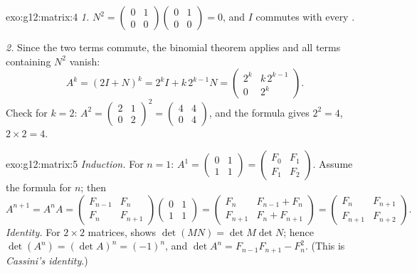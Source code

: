 \begin{solution}{exo:g12:matrix:4}
\emph{1.} $N^2 = \begin{pmatrix} 0&1\\0&0\end{pmatrix}
\begin{pmatrix} 0&1\\0&0\end{pmatrix} = 0$, and $I$ commutes with every
.

\emph{2.} Since the two terms commute, the binomial theorem applies and all
terms containing $N^2$ vanish:
\[
A^k = (2I + N)^k = 2^k I + k\,2^{k-1} N
= \begin{pmatrix} 2^k & k\,2^{k-1}\\ 0 & 2^k \end{pmatrix}.
\]
Check for $k = 2$:
$A^2 = \begin{pmatrix} 2&1\\0&2\end{pmatrix}^2
= \begin{pmatrix} 4&4\\0&4\end{pmatrix}$, and the formula gives
$2^2 = 4$, $2 \times 2 = 4$. \checkmark
\end{solution}

\begin{solution}{exo:g12:matrix:5}
\emph{Induction.} For $n = 1$:
$A^1 = \begin{pmatrix} 0&1\\1&1\end{pmatrix}
= \begin{pmatrix} F_0 & F_1\\ F_1 & F_2\end{pmatrix}$. Assume the formula
for $n$; then
\[
A^{n+1} = A^n A
= \begin{pmatrix} F_{n-1} & F_n\\ F_n & F_{n+1}\end{pmatrix}
\begin{pmatrix} 0 & 1\\ 1 & 1\end{pmatrix}
= \begin{pmatrix} F_n & F_{n-1} + F_n\\ F_{n+1} & F_n + F_{n+1}\end{pmatrix}
= \begin{pmatrix} F_n & F_{n+1}\\ F_{n+1} & F_{n+2}\end{pmatrix}.
\]
\emph{Identity.} For $2\times2$ matrices,  shows
$\det(MN) = \det M \det N$; hence
$\det(A^n) = (\det A)^n = (-1)^n$, and
$\det A^n = F_{n-1}F_{n+1} - F_n^2$. (This is \emph{Cassini's identity}.)
\end{solution}

